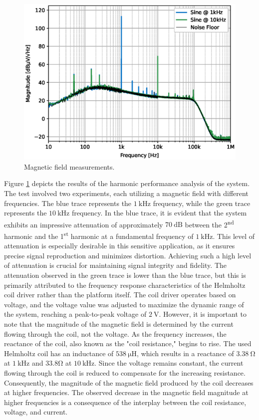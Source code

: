 \begin{figure}[!ht]
    \centering
    \includegraphics[width=.65\textwidth]{images/chapter_4/discussion_results/harmonics.eps}
    \caption{Magnetic field measurements.}
    \label{figure:harmonics}
\end{figure}

Figure \ref{figure:harmonics} depicts the results of the harmonic performance analysis of the system. The test involved two experiments, each utilizing a magnetic field with different frequencies. The blue trace represents the $\mathrm{1~kHz}$ frequency, while the green trace represents the $\mathrm{10~kHz}$ frequency. In the blue trace, it is evident that the system exhibits an impressive attenuation of approximately $\mathrm{70~dB}$ between the 2\textsuperscript{nd} harmonic and the 1\textsuperscript{st} harmonic at a fundamental frequency of $\mathrm{1~kHz}$. This level of attenuation is especially desirable in this sensitive application, as it ensures precise signal reproduction and minimizes distortion. Achieving such a high level of attenuation is crucial for maintaining signal integrity and fidelity. The attenuation observed in the green trace is lower than the blue trace, but this is primarily attributed to the frequency response characteristics of the Helmholtz coil driver rather than the platform itself. The coil driver operates based on voltage, and the voltage value was adjusted to maximize the dynamic range of the system, reaching a peak-to-peak voltage of $\mathrm{2~V}$. However, it is important to note that the magnitude of the magnetic field is determined by the current flowing through the coil, not the voltage. As the frequency increases, the reactance of the coil, also known as the "coil resistance," begins to rise. The used Helmholtz coil has an inductance of $\mathrm{538~\mu H}$, which results in a reactance of $\mathrm{3.38~\Omega}$ at $\mathrm{1~kHz}$ and $\mathrm{33.8\Omega}$ at $\mathrm{10~kHz}$. Since the voltage remains constant, the current flowing through the coil is reduced to compensate for the increasing resistance. Consequently, the magnitude of the magnetic field produced by the coil decreases at higher frequencies. The observed decrease in the magnetic field magnitude at higher frequencies is a consequence of the interplay between the coil resistance, voltage, and current. 

